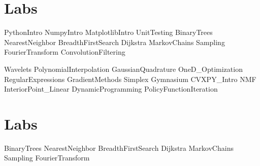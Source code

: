 \documentclass[opener-c,labs,red,nociteref]{HJnewsiambook}
\begin{document}
\mainmatter %

\ifbyu

\part{Labs} %
{PythonIntro}
{NumpyIntro}
{MatplotlibIntro}
{UnitTesting}
{BinaryTrees}
{NearestNeighbor}
{BreadthFirstSearch}
{Dijkstra}
{MarkovChains}
{Sampling}
{FourierTransform}
{ConvolutionFiltering}

{Wavelets}
{PolynomialInterpolation}
{GaussianQuadrature}
{OneD_Optimization}
{RegularExpressions}
{GradientMethods}
{Simplex}
{Gymnasium}
{CVXPY_Intro}
{NMF}
{InteriorPoint_Linear}
{DynamicProgramming}
{PolicyFunctionIteration}

\else 

\part{Labs} %
{BinaryTrees}
{NearestNeighbor}
{BreadthFirstSearch}
{Dijkstra}
{MarkovChains}
{Sampling}
{FourierTransform}
\end{document}
